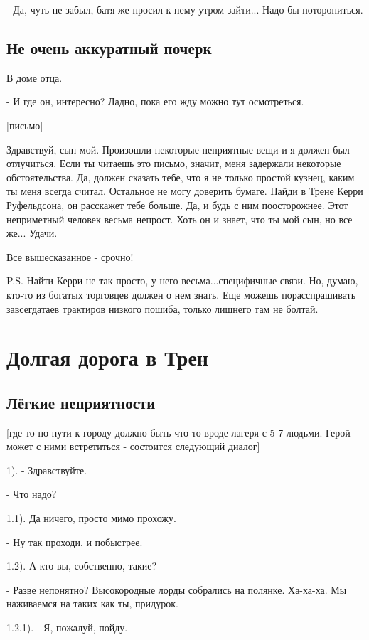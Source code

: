 \documentclass[12pt,a4paper]{book}
\begin{document}
- Да, чуть не забыл, батя же просил к нему утром зайти... Надо бы поторопиться.

\section{Не очень аккуратный почерк}

В доме отца.

- И где он, интересно? Ладно, пока его жду можно тут осмотреться.

[письмо]

Здравствуй, сын мой. Произошли некоторые неприятные вещи и я должен был отлучиться. Если ты читаешь это письмо, значит, меня задержали некоторые обстоятельства. Да, должен сказать тебе, что я не только простой кузнец, каким ты меня всегда считал. Остальное не могу доверить бумаге. Найди в Трене Керри Руфельдсона, он расскажет тебе больше. Да, и будь с ним поосторожнее. Этот неприметный человек весьма непрост. Хоть он и знает, что ты мой сын, но все же... Удачи.

Все вышесказанное - срочно!

P.S. Найти Керри не так просто, у него весьма...специфичные связи. Но, думаю, кто-то из богатых торговцев должен о нем знать. Еще можешь порасспрашивать завсегдатаев трактиров низкого пошиба, только лишнего там не болтай.

\chapter{Долгая дорога в Трен}

\section{Лёгкие неприятности}

[где-то по пути к городу должно быть что-то вроде лагеря с 5-7 людьми. Герой может с ними встретиться - состоится следующий диалог]

1). - Здравствуйте.

- Что надо?

1.1). Да ничего, просто мимо прохожу.

- Ну так проходи, и побыстрее.

1.2). А кто вы, собственно, такие?

- Разве непонятно? Высокородные лорды собрались на полянке. Ха-ха-ха. Мы наживаемся на таких как ты, придурок.

1.2.1). - Я, пожалуй, пойду.
\end{document}

